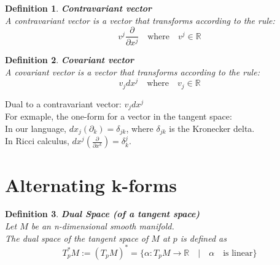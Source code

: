 \documentclass[11pt]{book} %
\newtheorem{definition}{Definition}[section]
\begin{document}
\begin{definition}{\textbf{Contravariant vector}} \\
    A contravariant vector is a vector that transforms according to the rule: \\
    \begin{equation*}
        v^j \frac{\partial}{\partial x^j} \quad \text{where} \quad v^j \in \mathbb{R}
    \end{equation*}
\end{definition}

\begin{definition}{\textbf{Covariant vector}} \\
    A covariant vector is a vector that transforms according to the rule: \\
    \begin{equation*}
        v_j dx^j \quad \text{where} \quad v_j \in \mathbb{R}
    \end{equation*}
\end{definition}

Dual to a contravariant vector: $v_j dx^j$\\
For exmaple, the one-form for a vector in the tangent space: \\
In our language, $dx_j(\partial_k) = \delta_{jk}$, where $\delta_{jk}$ is the Kronecker delta.\\
In Ricci calculus, $dx^j(\frac{\partial}{\partial x^k}) = \delta^j_k$.




\section{Alternating k-forms}

\begin{definition}{\textbf{Dual Space (of a tangent space)}} \\
    Let \( M \) be an n-dimensional smooth manifold. \\
    The dual space of the tangent space of \( M \) at \( p \) is defined as
    \begin{equation*}
        T_p^*M := (T_pM)^* = \{ \alpha : T_pM \to \mathbb{R} \quad | \quad \alpha \quad \text{is linear} \}
    \end{equation*}
\end{definition}
\end{document}
